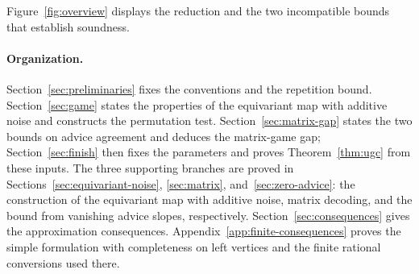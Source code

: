 Figure~\ref{fig:overview} displays the reduction and the two incompatible
bounds that establish soundness.


\paragraph{Organization.}
Section~\ref{sec:preliminaries} fixes the conventions and the repetition
bound. Section~\ref{sec:game} states the properties of the equivariant map with additive noise and constructs the
permutation test. Section~\ref{sec:matrix-gap} states the two bounds on
advice agreement and deduces the matrix-game gap; Section~\ref{sec:finish}
then fixes the parameters and proves Theorem~\ref{thm:ugc} from these inputs.
The three supporting branches are proved in Sections~\ref{sec:equivariant-noise},
\ref{sec:matrix}, and~\ref{sec:zero-advice}: the construction of the equivariant map with additive noise, matrix
decoding, and the bound from vanishing advice slopes, respectively.
Section~\ref{sec:consequences} gives the approximation consequences.
Appendix~\ref{app:finite-consequences} proves the simple formulation with completeness on left
vertices and the finite rational conversions used there.

